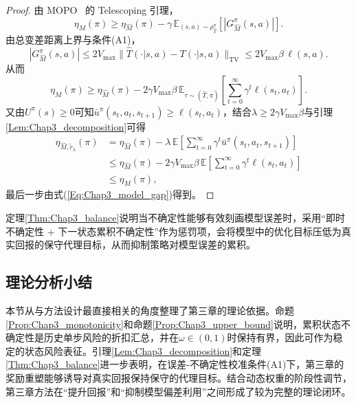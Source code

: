 \begin{proof}
  由 MOPO~\cite{Yu2020MOPO} 的 Telescoping 引理，
  \begin{equation}
    \eta_M(\pi)
    \ge\eta_{\hat{M}}(\pi)-\gamma\,\mathbb{E}_{(s,a)\sim\rho^{\pi}_{\hat{T}}}\left[\left|G^{\pi}_{\hat{M}}(s,a)\right|\right].
  \end{equation}
  由总变差距离上界与条件(A1)，
  \begin{equation}
    \left|G^{\pi}_{\hat{M}}(s,a)\right|
    \le2V_{\max}\|\hat{T}(\cdot|s,a)-T(\cdot|s,a)\|_{\mathrm{TV}}
    \le2V_{\max}\beta\,\ell(s,a).
  \end{equation}
  从而
  \begin{equation}\label{Eq:Chap3_model_gap}
    \eta_M(\pi)
    \ge\eta_{\hat{M}}(\pi)-2\gamma V_{\max}\beta\,\mathbb{E}_{\tau\sim(\hat{T},\pi)}\left[\sum_{t=0}^{\infty}\gamma^t\ell(s_t,a_t)\right].
  \end{equation}
  又由$U^{\pi}(s)\ge0$可知$\bar{u}^{\pi}(s_t,a_t,s_{t+1})\ge\ell(s_t,a_t)$，结合$\lambda\ge2\gamma V_{\max}\beta$与引理\ref{Lem:Chap3_decomposition}可得
  \begin{align}
    \eta_{\hat{M},\tilde{r}_{\lambda}}(\pi)
    &=\eta_{\hat{M}}(\pi)-\lambda\,\mathbb{E}\left[\sum_{t=0}^{\infty}\gamma^t\bar{u}^{\pi}(s_t,a_t,s_{t+1})\right]\\
    &\le\eta_{\hat{M}}(\pi)-2\gamma V_{\max}\beta\,\mathbb{E}\left[\sum_{t=0}^{\infty}\gamma^t\ell(s_t,a_t)\right]\\
    &\le\eta_M(\pi),
  \end{align}
  最后一步由式(\ref{Eq:Chap3_model_gap})得到。
\end{proof}

定理\ref{Thm:Chap3_balance}说明当不确定性能够有效刻画模型误差时，采用“即时不确定性 + 下一状态累积不确定性”作为惩罚项，会将模型中的优化目标压低为真实回报的保守代理目标，从而抑制策略对模型误差的累积。

\subsection{理论分析小结}\label{Sec3.3.3}

本节从与方法设计最直接相关的角度整理了第三章的理论依据。命题\ref{Prop:Chap3_monotonicity}和命题\ref{Prop:Chap3_upper_bound}说明，累积状态不确定性是历史单步风险的折扣汇总，并在$\omega\in(0,1)$时保持有界，因此可作为稳定的状态风险表征。引理\ref{Lem:Chap3_decomposition}和定理\ref{Thm:Chap3_balance}进一步表明，在误差-不确定性校准条件(A1)下，第三章的奖励重塑能够诱导对真实回报保持保守的代理目标。结合动态权重的阶段性调节，第三章方法在“提升回报”和“抑制模型偏差利用”之间形成了较为完整的理论闭环。

